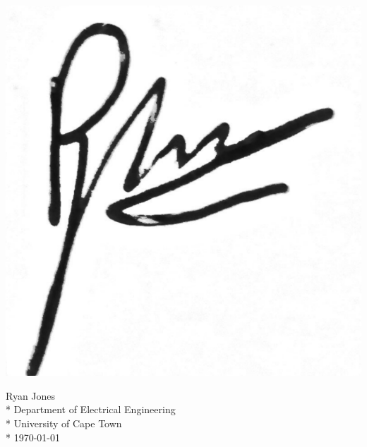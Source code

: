 \documentclass[a4paper, 11pt, oneside, openright, parskip=full]{book}
\newcommand{\auth}{Ryan Jones}							%
\newcommand{\dept}{Department of Electrical Engineering}%
\newcommand{\uni}{University of Cape Town}				%
\newcommand*{\signature}[1]
{
	\par\noindent\makebox [8cm]{\hrulefill}
	\par\noindent\makebox [8cm][1]{#1}
}
\begin{document}
\begin{flushright}	%
	\vskip 2cm
    \includegraphics[scale = 0.22]{Figures/FrontMatter/ryanSignature.png}
    \vspace*{-4\baselineskip}
	\noindent \signature{x}
	\noindent \auth \\*
	\vskip 2mm
	\noindent \dept \\*
	\noindent \uni \\*
	\vskip 2mm
	\noindent \today
\end{flushright}
\pagebreak


\pagebreak
\tableofcontents
{}
\pagebreak
\listoffigures
{}
\end{document}
